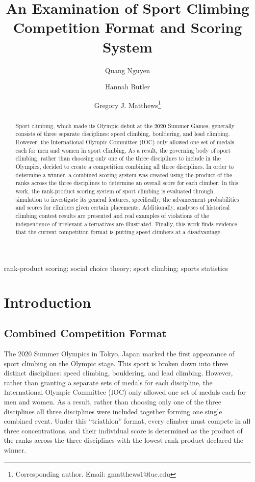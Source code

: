 \documentclass[letterpaper, inpress]{jds} %
\title[An Examination of Sport Climbing]{An Examination of Sport Climbing Competition Format and Scoring System}
\author[1]{Quang Nguyen}
\author[2]{Hannah Butler}
\author[1]{Gregory J. Matthews\footnote{Corresponding author. Email: gmatthews1@luc.edu}}
\affil[1]{Department of Mathematics and Statistics, Loyola University Chicago, Chicago, IL, USA}
\affil[2]{Department of Statistics, Colorado State University, Fort Collins, CO, USA}
\begin{document}
\maketitle
\begin{abstract}
Sport climbing, which made its Olympic debut at the 2020 Summer Games, generally consists of three separate disciplines: speed climbing, bouldering, and lead climbing. However, the International Olympic Committee (IOC) only allowed one set of medals each for men and women in sport climbing. As a result, the governing body of sport climbing, rather than choosing only one of the three disciplines to include in the Olympics, decided to create a competition combining all three disciplines. In order to determine a winner, a combined scoring system was created using the product of the ranks across the three disciplines to determine an overall score for each climber. In this work, the rank-product scoring system of sport climbing is evaluated through simulation to investigate its general features, specifically, the advancement probabilities and scores for climbers given certain placements. Additionally, analyses of historical climbing contest results are presented and real examples of violations of the independence of irrelevant alternatives are illustrated. Finally, this work finds evidence that the current competition format is putting speed climbers at a disadvantage.\@
\end{abstract}

\begin{keywords} %
rank-product scoring; social choice theory; sport climbing; sports statistics
\end{keywords}

\section{Introduction}
\label{sec:sec1}

\subsection{Combined Competition Format}
\label{sec1pt1}

The 2020 Summer Olympics in Tokyo, Japan marked the first appearance of
sport climbing on the Olympic stage. This sport is broken down into
three distinct disciplines: speed climbing, bouldering, and lead
climbing. However, rather than granting a separate sets of medals for
each discipline, the International Olympic Committee (IOC) only allowed
one set of medals each for men and women. As a result, rather than
choosing only one of the three disciplines all three disciplines were
included together forming one single combined event. Under this
``triathlon'' format, every climber must compete in all three
concentrations, and their individual score is determined as the product
of the ranks across the three disciplines with the lowest rank product
declared the winner.
\end{document}
